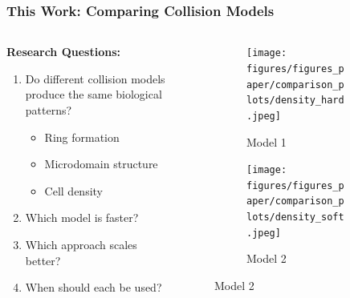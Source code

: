 \documentclass[10pt,t]{beamer}
\begin{document}
\begin{frame}
    \frametitle{This Work: Comparing Collision Models}

    \begin{columns}
        \begin{column}{0.6\textwidth}
            \textbf{Research Questions:}
            \begin{enumerate}
                \item Do different collision models produce the same biological patterns?
                      \begin{itemize}
                          \item Ring formation
                          \item Microdomain structure
                          \item Cell density
                      \end{itemize}
                \item Which model is faster?
                \item Which approach scales better?
                \item When should each be used?
            \end{enumerate}
        \end{column}

        \begin{column}{0.4\textwidth}

            \vspace{-0.8cm}
            \begin{figure}
                \centering
                \begin{subfigure}{0.63\textwidth}
                    \centering
                    \texttt{[image: figures/figures\_paper/comparison\_plots/density\_hard.jpeg]}
                    \caption{{Model 1}}
                \end{subfigure}
                \vfill
                \begin{subfigure}{0.63\textwidth}
                    \centering
                    \texttt{[image: figures/figures\_paper/comparison\_plots/density\_soft.jpeg]}
                    \caption{{Model 2}}
                \end{subfigure}
            \end{figure}
        \end{column}
    \end{columns}

\end{frame}
\end{document}
